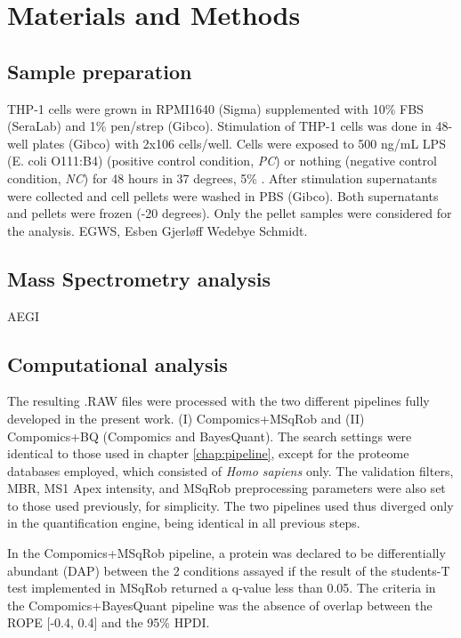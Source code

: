 \section{Materials and Methods}

\subsection{Sample preparation}

THP-1 cells were grown in RPMI1640 (Sigma) supplemented with 10\% FBS (SeraLab) and 1\% pen/strep (Gibco). Stimulation of THP-1 cells was done in 48-well plates (Gibco) with 2x106 cells/well. Cells were exposed to 500 ng/mL LPS (E. coli O111:B4) (positive control condition, \textit{PC}) or nothing (negative control condition, \textit{NC}) for 48 hours in 37 degrees, 5\% . After stimulation supernatants were collected and cell pellets were washed in PBS (Gibco). Both supernatants and pellets were frozen (-20 degrees). Only the pellet samples were considered for the analysis. EGWS, Esben Gjerløff Wedebye Schmidt.
 
\subsection{Mass Spectrometry analysis}

AEGI

\subsection{Computational analysis}

The resulting .RAW files were processed with the two different pipelines fully developed in the present work. (I) Compomics+MSqRob and (II) Compomics+BQ (Compomics and BayesQuant). The search settings were identical to those used in chapter \ref{chap:pipeline}, except for the proteome databases employed, which consisted of \textit{Homo sapiens} only. The validation filters, \ac{MBR}, MS1 Apex intensity, and MSqRob preprocessing parameters were also set to those used previously, for simplicity. The two pipelines used thus diverged only in the quantification engine, being identical in all previous steps.

In the Compomics+MSqRob pipeline, a protein was declared to be differentially abundant (\ac{DAP}) between the 2 conditions assayed if the result of the student\textquotesingle s-T test implemented in MSqRob returned a q-value less than 0.05. The criteria in the Compomics+BayesQuant pipeline was the absence of overlap between the \ac{ROPE} [-0.4, 0.4] and the 95\% \ac{HPDI}.


